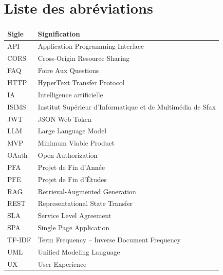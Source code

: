 \chapter*{Liste des abréviations}

\begin{tabularx}{\textwidth}{|l|X|}
\hline
\textbf{Sigle} & \textbf{Signification} \\
\hline
API & Application Programming Interface \\
\hline
CORS & Cross-Origin Resource Sharing \\
\hline
FAQ & Foire Aux Questions \\
\hline
HTTP & HyperText Transfer Protocol \\
\hline
IA & Intelligence artificielle \\
\hline
ISIMS & Institut Supérieur d'Informatique et de Multimédia de Sfax \\
\hline
JWT & JSON Web Token \\
\hline
LLM & Large Language Model \\
\hline
MVP & Minimum Viable Product \\
\hline
OAuth & Open Authorization \\
\hline
PFA & Projet de Fin d'Année \\
\hline
PFE & Projet de Fin d'Études \\
\hline
RAG & Retrieval-Augmented Generation \\
\hline
REST & Representational State Transfer \\
\hline
SLA & Service Level Agreement \\
\hline
SPA & Single Page Application \\
\hline
TF-IDF & Term Frequency -- Inverse Document Frequency \\
\hline
UML & Unified Modeling Language \\
\hline
UX & User Experience \\
\hline
\end{tabularx}
